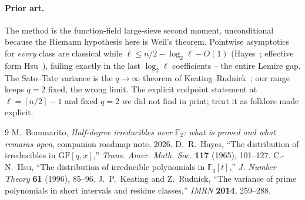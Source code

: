 \documentclass[10pt]{article}
\theoremstyle{plain}
\newcommand{\F}{\mathbb F}
\newcommand{\ceil}[1]{\left\lceil #1\right\rceil}
\begin{document}
\paragraph{Prior art.}
The method is the function-field large-sieve second moment, unconditional
because the Riemann hypothesis here is Weil's theorem. Pointwise asymptotics
for \emph{every} class are classical while $\ell\le n/2-\log_2\ell-O(1)$
(Hayes~\cite{hayes}; effective form Hsu~\cite{hsu}), failing exactly in the
last $\log_2\ell$ coefficients -- the entire Lemire gap. The Sato--Tate
variance is the $q\to\infty$ theorem of Keating--Rudnick~\cite{kr}; our range
keeps $q=2$ fixed, the wrong limit. The explicit endpoint statement at
$\ell=\ceil{n/2}-1$ and fixed $q=2$ we did not find in print; treat it as
folklore made explicit.

\vspace{-6pt}
\begin{thebibliography}{9}
\small
\setlength{\itemsep}{-3pt}\setlength{\parsep}{0pt}
 M.~Bommarito, \emph{Half-degree irreducibles over $\F_2$:
  what is proved and what remains open}, companion roadmap note, 2026.
 D.~R.~Hayes, ``The distribution of irreducibles in
  $\mathrm{GF}[q,x]$,'' \emph{Trans. Amer. Math. Soc.} \textbf{117} (1965),
  101--127.
 C.-N.~Hsu, ``The distribution of irreducible polynomials in
  $\F_q[t]$,'' \emph{J. Number Theory} \textbf{61} (1996), 85--96.
 J.~P.~Keating and Z.~Rudnick, ``The variance of prime
  polynomials in short intervals and residue classes,'' \emph{IMRN}
  \textbf{2014}, 259--288.
\end{thebibliography}
\end{document}
